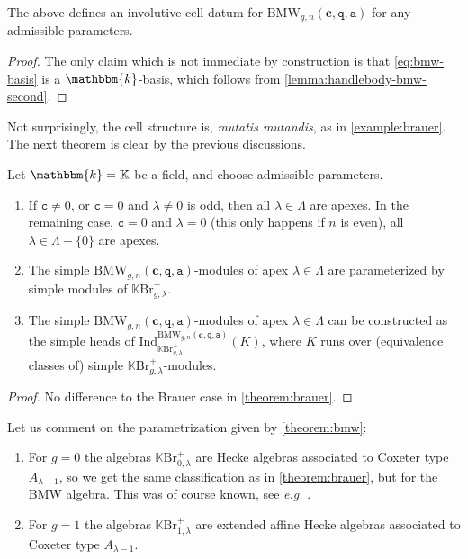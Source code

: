 \documentclass[a4paper,11pt]{amsart}
\newcommand{\eg}{\textsl{e.g.}}
\newcommand{\muta}{\textsl{mutatis mutandis}}
\newcommand{\setstuff}[1]{\mathrm{#1}}
\newcommand{\K}{\mathbb{K}}
\newcommand{\KK}{\mathbbm{k}}
\newcommand{\bsym}[1]{\boldsymbol{#1}}
\newcommand{\varsym}[1]{\mathtt{#1}}
\newcommand{\qvar}{\varsym{q}}
\newcommand{\cpar}{\bsym{c}}
\newcommand{\cvar}{\varsym{c}}
\newcommand{\avar}{\varsym{a}}
\numberwithin{equation}{section}
\let\fullref\autoref
\begin{document}
\begin{proposition}\label{proposition:bmw-basis}
The above defines an involutive 
cell datum for $\setstuff{BMW}_{g,n}(\cpar,\qvar,\avar)$ 
for any admissible parameters.
\end{proposition}

\begin{proof}
The only claim which is not immediate by construction is 
that \eqref{eq:bmw-basis} is a $\KK$-basis, which
follows from \fullref{lemma:handlebody-bmw-second}.
\end{proof}

Not surprisingly, the cell 
structure is, {\muta}, as in \fullref{example:brauer}.
The next theorem is 
clear by the previous discussions.

\begin{theorem}\label{theorem:bmw}
Let $\KK=\K$ be a field, and choose admissible parameters.
\begin{enumerate}

\item If $\cvar\neq 0$, or $\cvar=0$ and $\lambda\neq 0$ is odd, 
then all $\lambda\in\Lambda$ are apexes. In the remaining case, 
$\cvar=0$ and $\lambda=0$ (this only happens if $n$ is even), all $\lambda\in\Lambda-\{0\}$ are apexes.

\item The simple $\setstuff{BMW}_{g,n}(\cpar,\qvar,\avar)$-modules of 
apex $\lambda\in\Lambda$ 
are parameterized by simple modules of $\K\setstuff{Br}_{g,\lambda}^{+}$.

\item The simple $\setstuff{BMW}_{g,n}(\cpar,\qvar,\avar)$-modules of 
apex $\lambda\in\Lambda$ can be constructed as 
the simple heads of
$\mathrm{Ind}_{\K\setstuff{Br}_{g,\lambda}^{+}}^{\setstuff{BMW}_{g,n}(\cpar,\qvar,\avar)}(K)$, 
where $K$ runs over (equivalence classes of) 
simple $\K\setstuff{Br}_{g,\lambda}^{+}$-modules.

\end{enumerate}
\end{theorem}

\begin{proof}
No difference to the Brauer case in \fullref{theorem:brauer}.
\end{proof}

\begin{example}
Let us comment on the parametrization given by 
\fullref{theorem:bmw}:
\begin{enumerate}

\item For $g=0$ the algebras $\K\setstuff{Br}_{0,\lambda}^{+}$ 
are Hecke algebras associated to Coxeter type 
$A_{\lambda-1}$, so we get the same classification 
as in \fullref{theorem:brauer}, but for the BMW algebra. 
This was of course known, see {\eg} \cite[Corollary 3.14]{Xi-bmw}.

\item For $g=1$ the algebras $\K\setstuff{Br}_{1,\lambda}^{+}$
are extended affine Hecke algebras associated to Coxeter type 
$A_{\lambda-1}$.

\end{enumerate}
\end{example}
\end{document}
